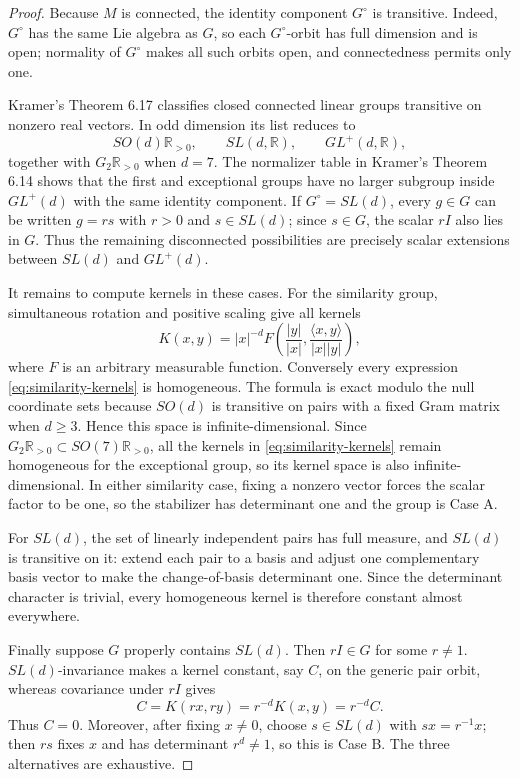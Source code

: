 \documentclass[11pt]{article}
\newcommand{\R}{\mathbb R}
\begin{document}
\begin{proof}
Because $M$ is connected, the identity component $G^\circ$ is transitive.  Indeed, $G^\circ$ has the same Lie algebra as $G$, so each $G^\circ$-orbit has full dimension and is open; normality of $G^\circ$ makes all such orbits open, and connectedness permits only one.

Kramer's Theorem 6.17 \cite{Kramer} classifies closed connected linear groups transitive on nonzero real vectors.  In odd dimension its list reduces to
\[
 SO(d)\R_{>0},\qquad SL(d,\R),\qquad GL^+(d,\R),
\]
together with $G_2\R_{>0}$ when $d=7$.  The normalizer table in Kramer's Theorem 6.14 shows that the first and exceptional groups have no larger subgroup inside $GL^+(d)$ with the same identity component.  If $G^\circ=SL(d)$, every $g\in G$ can be written $g=rs$ with $r>0$ and $s\in SL(d)$; since $s\in G$, the scalar $rI$ also lies in $G$.  Thus the remaining disconnected possibilities are precisely scalar extensions between $SL(d)$ and $GL^+(d)$.

It remains to compute kernels in these cases.  For the similarity group, simultaneous rotation and positive scaling give all kernels
\begin{equation}\label{eq:similarity-kernels}
 K(x,y)=|x|^{-d}
 F\!\left(\frac{|y|}{|x|},\frac{\langle x,y\rangle}{|x||y|}\right),
\end{equation}
where $F$ is an arbitrary measurable function.  Conversely every expression \eqref{eq:similarity-kernels} is homogeneous.  The formula is exact modulo the null coordinate sets because $SO(d)$ is transitive on pairs with a fixed Gram matrix when $d\geq3$.  Hence this space is infinite-dimensional.  Since $G_2\R_{>0}\subset SO(7)\R_{>0}$, all the kernels in \eqref{eq:similarity-kernels} remain homogeneous for the exceptional group, so its kernel space is also infinite-dimensional.  In either similarity case, fixing a nonzero vector forces the scalar factor to be one, so the stabilizer has determinant one and the group is Case A.

For $SL(d)$, the set of linearly independent pairs has full measure, and $SL(d)$ is transitive on it: extend each pair to a basis and adjust one complementary basis vector to make the change-of-basis determinant one.  Since the determinant character is trivial, every homogeneous kernel is therefore constant almost everywhere.

Finally suppose $G$ properly contains $SL(d)$.  Then $rI\in G$ for some $r\ne1$.  $SL(d)$-invariance makes a kernel constant, say $C$, on the generic pair orbit, whereas covariance under $rI$ gives
\[
 C=K(rx,ry)=r^{-d}K(x,y)=r^{-d}C.
\]
Thus $C=0$.  Moreover, after fixing $x\ne0$, choose $s\in SL(d)$ with $sx=r^{-1}x$; then $rs$ fixes $x$ and has determinant $r^d\ne1$, so this is Case B.  The three alternatives are exhaustive.
\end{proof}
\end{document}

